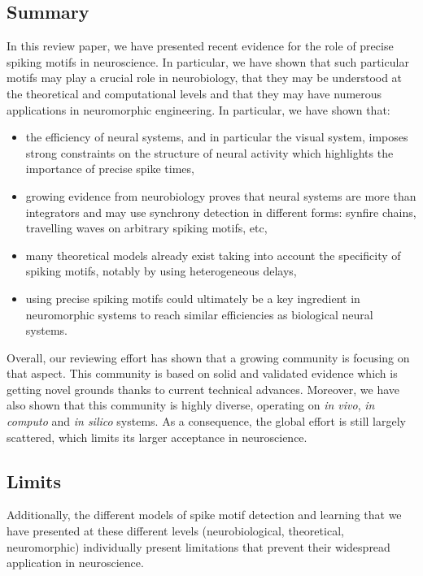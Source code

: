 \documentclass[brainsci, %
               review,submit,pdftex,moreauthors
               ]{Definitions/mdpi}
\begin{document}
\subsection{Summary}
In this review paper, we have presented recent evidence for the role of precise spiking motifs in neuroscience. In particular, we have shown that such particular motifs may play a crucial role in neurobiology, that they may be understood at the theoretical and computational levels and that they may have numerous applications in neuromorphic engineering. In particular, we have shown that:
\begin{itemize}
  \item  the efficiency of neural systems, and in particular the visual system, imposes strong constraints on the structure of neural activity which highlights the importance of precise spike times,
  \item  growing evidence from neurobiology proves that neural systems are more than integrators and may use synchrony detection in different forms: synfire chains, travelling waves on arbitrary spiking motifs, etc,
  \item  many theoretical models already exist taking into account the specificity of spiking motifs, notably by using heterogeneous delays,
  \item  using precise spiking motifs could ultimately be a key ingredient in neuromorphic systems to reach similar efficiencies as biological neural systems.
\end{itemize}
 Overall, our reviewing effort has shown that a growing community is focusing on that aspect. This community is based on solid and validated evidence which is getting novel grounds thanks to current technical advances. Moreover, we have also shown that this community is highly diverse, operating on \emph{in vivo}, \emph{in computo} and \emph{in silico} systems. As a consequence, the global effort is still largely scattered, which limits its larger acceptance in neuroscience. 

\subsection{Limits}
Additionally, the different models of spike motif detection and learning that we have presented at these different levels (neurobiological, theoretical, neuromorphic) individually present limitations that prevent their widespread application in neuroscience.
\end{document}
